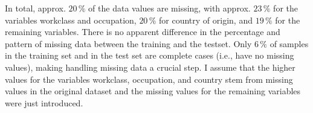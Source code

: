 In total, approx. $20\,\%$ of the data values are missing, with approx. $23\,\%$ for the variables workclass and occupation, $20\,\%$ for country of origin, and $19\,\%$ for the remaining variables. There is no apparent difference in the percentage and pattern of missing data between the training and the testset. Only $6\,\%$ of samples in the training set and in the test set are complete cases (i.e., have no missing values), making handling missing data a crucial step. I assume that the higher values for the variables workclass, occupation, and country stem from missing values in the original dataset and the missing values for the remaining variables were just introduced. 